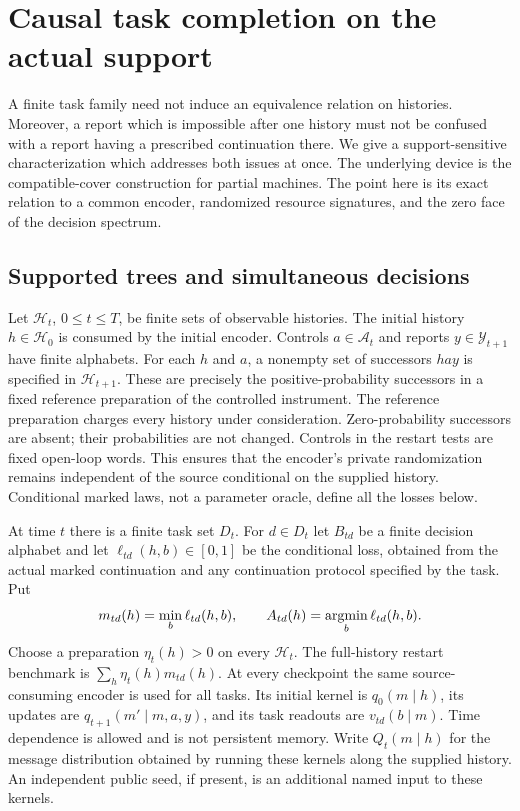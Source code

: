 \section{Causal task completion on the actual support}
\label{sec:v12-support}

A finite task family need not induce an equivalence relation on histories.
Moreover, a report which is impossible after one history must not be
confused with a report having a prescribed continuation there. We give a
support-sensitive characterization which addresses both issues at once.
The underlying device is the compatible-cover construction for partial
machines. The point here is its exact relation to a common encoder,
randomized resource signatures, and the zero face of the decision spectrum.

\subsection{Supported trees and simultaneous decisions}
Let $\mathcal H_t$, $0\le t\le T$, be finite sets of observable histories.
The initial history $h\in\mathcal H_0$ is consumed by the initial encoder.
Controls $a\in\mathcal A_t$ and reports $y\in\mathcal Y_{t+1}$ have finite
alphabets. For each $h$ and $a$, a nonempty set of successors $hay$ is
specified in $\mathcal H_{t+1}$. These are precisely the positive-probability
successors in a fixed reference preparation of the controlled instrument.
The reference preparation charges every history under consideration.
Zero-probability successors are absent; their probabilities are not changed.
Controls in the restart tests are fixed open-loop words. This ensures
that the encoder's private randomization remains independent of the source
conditional on the supplied history. Conditional marked laws, not a
parameter oracle, define all the losses below.

At time $t$ there is a finite task set $D_t$. For $d\in D_t$ let $B_{td}$
be a finite decision alphabet and let $\ell_{td}(h,b)\in[0,1]$ be the
conditional loss, obtained from the actual marked continuation and any
continuation protocol specified by the task. Put
\[
 m_{td}(h)=\min_b\ell_{td}(h,b),\qquad
 A_{td}(h)=\operatorname*{argmin}_b\ell_{td}(h,b).
\]
Choose a preparation $\eta_t(h)>0$ on every $\mathcal H_t$. The full-history
restart benchmark is $\sum_h\eta_t(h)m_{td}(h)$. At every checkpoint the
same source-consuming encoder is used for all tasks. Its initial kernel is
$q_0(m\mid h)$, its updates are $q_{t+1}(m'\mid m,a,y)$, and its task
readouts are $v_{td}(b\mid m)$. Time dependence is allowed and is not
persistent memory. Write $Q_t(m\mid h)$ for the message distribution
obtained by running these kernels along the supplied history. An independent
public seed, if present, is an additional named input to these kernels.

